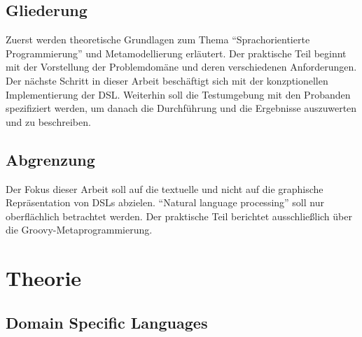 \documentclass[11pt,english,ngerman, headsepline]{scrreprt}
\begin{document}
\section{Gliederung}

Zuerst werden theoretische Grundlagen zum Thema “Sprachorientierte
Programmierung” und Metamodellierung erläutert. Der praktische Teil beginnt mit
der Vorstellung der Problemdomäne und deren verschiedenen Anforderungen. 
Der nächste Schritt in dieser Arbeit beschäftigt sich mit der konzptionellen
Implementierung der DSL.  Weiterhin
soll die Testumgebung mit den Probanden spezifiziert werden, um danach die
Durchführung und die Ergebnisse auszuwerten und zu beschreiben.

\section{Abgrenzung}
Der Fokus dieser Arbeit soll auf die textuelle und nicht auf die graphische
Repräsentation von DSLs abzielen. “Natural language processing” soll nur
oberflächlich betrachtet werden. Der praktische Teil berichtet ausschließlich
über die Groovy-Metaprogrammierung. 

\chapter{Theorie}

\section{Domain Specific Languages}
 
\end{document}
